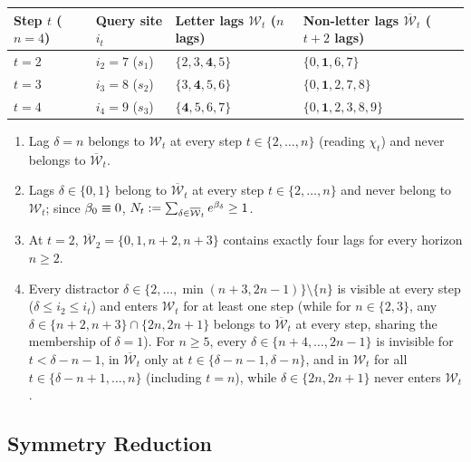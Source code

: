 \begin{center}
\small
\renewcommand{\arraystretch}{1.15}
\begin{tabular}{@{}llll@{}}
\toprule
Step $t$ ($n = 4$) & Query site $i_t$ & Letter lags $\mathcal W_t$ ($n$ lags) & Non-letter lags $\overline{\mathcal W}_t$ ($t+2$ lags)\\
\midrule
$t = 2$ & $i_2 = 7$ ($s_1$) & $\{2, 3, \mathbf{4}, 5\}$ & $\{0, \mathbf{1}, 6, 7\}$\\
$t = 3$ & $i_3 = 8$ ($s_2$) & $\{3, \mathbf{4}, 5, 6\}$ & $\{0, \mathbf{1}, 2, 7, 8\}$\\
$t = 4$ & $i_4 = 9$ ($s_3$) & $\{\mathbf{4}, 5, 6, 7\}$ & $\{0, \mathbf{1}, 2, 3, 8, 9\}$\\
\bottomrule
\end{tabular}
\end{center}
\begin{enumerate}[label=(\roman*),leftmargin=*,nosep,topsep=3pt]
\item Lag $\delta = n$ belongs to $\mathcal W_t$ at every step $t \in \{2,\ldots,n\}$ (reading $\chi_t$) and never belongs to $\overline{\mathcal W}_t$.
\item Lags $\delta \in \{0, 1\}$ belong to $\overline{\mathcal W}_t$ at every step $t \in \{2,\ldots,n\}$ and never belong to $\mathcal W_t$; since $\beta_0 \equiv 0$, $N_t := \sum_{\delta\in\overline{\mathcal W}_t} e^{\beta_\delta} \ge 1$.
\item At $t = 2$, $\overline{\mathcal W}_2 = \{0, 1, n+2, n+3\}$ contains exactly four lags for every horizon $n \ge 2$.
\item Every distractor $\delta \in \{2,\ldots,\min(n+3, 2n-1)\}\setminus\{n\}$ is visible at every step ($\delta \le i_2 \le i_t$) and enters $\mathcal W_t$ for at least one step (while for $n \in \{2,3\}$, any $\delta \in \{n+2, n+3\} \cap \{2n, 2n+1\}$ belongs to $\overline{\mathcal W}_t$ at every step, sharing the membership of $\delta = 1$). For $n \ge 5$, every $\delta \in \{n+4,\ldots,2n-1\}$ is invisible for $t < \delta-n-1$, in $\overline{\mathcal W}_t$ only at $t \in \{\delta-n-1, \delta-n\}$, and in $\mathcal W_t$ for all $t \in \{\delta-n+1,\ldots,n\}$ (including $t = n$), while $\delta \in \{2n, 2n+1\}$ never enters $\mathcal W_t$.
\end{enumerate}

\subsection{Symmetry Reduction}
\label{app:J-reduce-sub}

